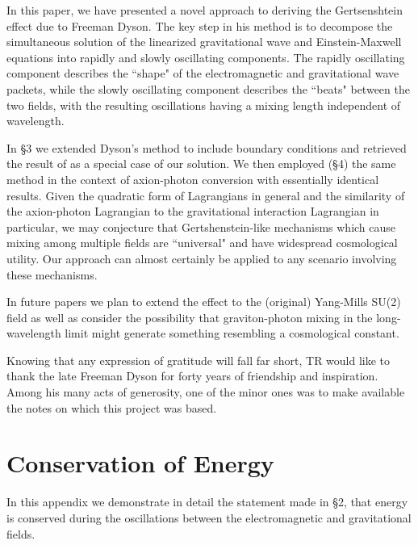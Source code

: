 \documentclass[12pt]{article}
\def\\{\hfill\break} \let\==\equiv
\renewcommand{\theequation}{\arabic{section}.\arabic{equation}}
\begin{document}
In this paper, we have presented a novel approach to deriving the Gertsenshtein effect due to Freeman Dyson. The key step in his method is to decompose the simultaneous solution of the linearized gravitational wave and Einstein-Maxwell equations into rapidly and slowly oscillating components. The rapidly oscillating component describes the ``shape" of the electromagnetic and gravitational wave packets, while the slowly oscillating component describes the ``beats" between the two fields, with the resulting oscillations having a mixing length independent of wavelength. 

In \S 3 we extended Dyson's method to include boundary conditions and retrieved the result of \cite{Bocc70} as a special case of our solution. We then employed (\S 4) the same method in the context of axion-photon conversion with essentially identical results. Given the quadratic form of Lagrangians in general and the similarity of the axion-photon Lagrangian to the gravitational interaction Lagrangian in particular, we may conjecture that Gertshenstein-like mechanisms which cause mixing among multiple fields are ``universal" and have widespread cosmological utility. Our approach can almost certainly be applied to any scenario involving these mechanisms. 

In future papers we plan to extend the effect to the (original) Yang-Mills SU(2) field as well as consider the possibility that graviton-photon mixing in the long-wavelength limit might generate something resembling a cosmological constant.\\


Knowing that any expression of gratitude will fall far short, TR would like to thank the late Freeman Dyson for forty years of friendship and inspiration.  Among his many acts of generosity, one of the minor ones was to make available the notes on which this project was based. 

\newpage
\appendix
\section{Conservation of Energy}
\renewcommand{\theequation}{A.\arabic{equation}}
\setcounter{equation}{0}
In this appendix we demonstrate in detail the statement made in \S 2, that energy is conserved during the oscillations between the electromagnetic and gravitational fields.
\end{document}
